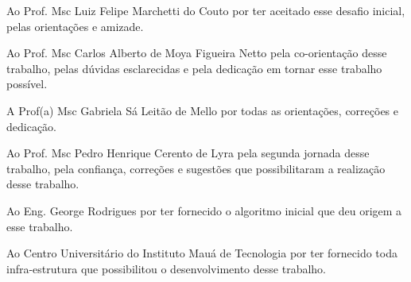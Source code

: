 \begin{agradecimentos}

Ao Prof. Msc Luiz Felipe Marchetti do Couto por ter aceitado esse desafio inicial, pelas orientações e amizade.

Ao Prof. Msc Carlos Alberto de Moya Figueira Netto pela co-orientação desse trabalho, pelas dúvidas esclarecidas e pela dedicação em tornar esse trabalho possível.

A Prof(a) Msc Gabriela Sá Leitão de Mello por todas as orientações, correções e dedicação. 

Ao Prof. Msc Pedro Henrique Cerento de Lyra pela segunda jornada desse trabalho, pela confiança, correções e sugestões que possibilitaram a realização desse trabalho.

Ao Eng. George Rodrigues por ter fornecido o algoritmo inicial que deu origem a esse trabalho.

Ao Centro Universitário do Instituto Mauá de Tecnologia por ter fornecido toda infra-estrutura que possibilitou o desenvolvimento desse trabalho.


\end{agradecimentos}